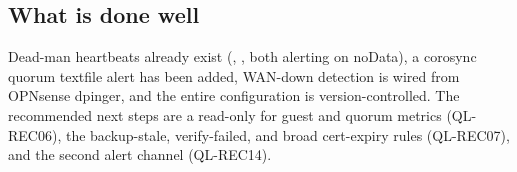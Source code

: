 \subsection{What is done well}

Dead-man heartbeats already exist (, , both
alerting on noData), a corosync quorum textfile alert has been added, WAN-down detection is wired
from OPNsense dpinger, and the entire configuration is version-controlled. The recommended next
steps are a read-only  for guest and quorum metrics (QL-REC06), the
backup-stale, verify-failed, and broad cert-expiry rules (QL-REC07), and the second alert channel
(QL-REC14).
